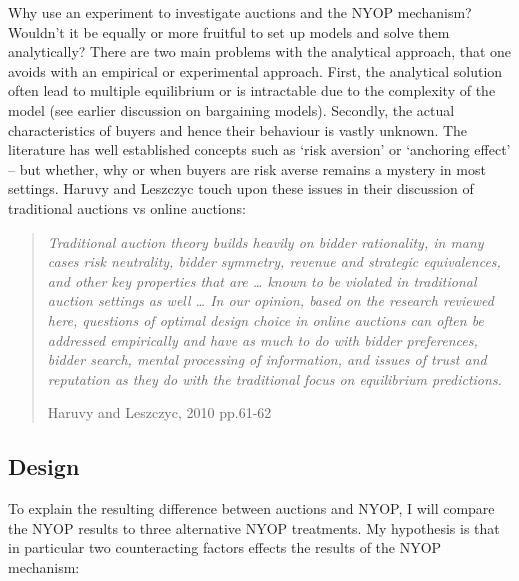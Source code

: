 \documentclass[a4paper,12pt]{article}
\begin{document}
	Why use an experiment to investigate auctions and the NYOP mechanism? Wouldn't it be equally or more fruitful to set up models and solve them analytically? There are two main problems with the analytical approach, that one avoids with an empirical or experimental approach. First, the analytical solution often lead to multiple equilibrium or is intractable due to the complexity of the model (see earlier discussion on bargaining models). Secondly, the actual characteristics of buyers and hence their behaviour is vastly unknown. The literature has well established concepts such as `risk aversion' or `anchoring effect' -- but whether, why or when buyers are risk averse remains a mystery in most settings. Haruvy and Leszczyc touch upon these issues in their discussion of traditional auctions vs online auctions:
	\blockquote[Haruvy and Leszczyc, 2010 pp.61-62]{\emph{Traditional auction theory builds heavily on bidder rationality, in many cases risk neutrality, bidder symmetry, revenue and strategic equivalences, and other key properties that are … known to be violated in traditional auction settings as well … In our opinion, based on the research reviewed here, questions of optimal design choice in online auctions can often be addressed empirically and have as much to do with bidder preferences, bidder search, mental processing of information, and issues of trust and reputation as they do with the traditional focus on equilibrium predictions. }}


	\subsection{Design}

	To explain the resulting difference between auctions and NYOP, I will compare the NYOP results to three alternative NYOP treatments. My hypothesis is that in particular two counteracting factors effects the results of the NYOP mechanism:
\end{document}
